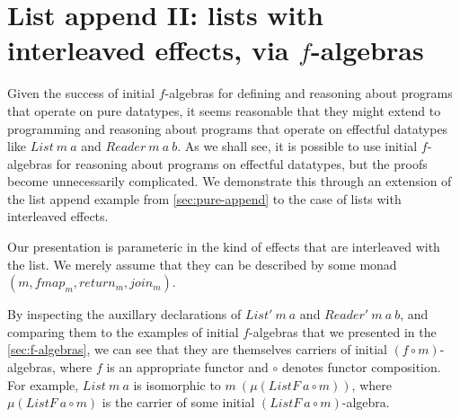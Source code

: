 \documentclass{jfp1}
\begin{document}
\section{List append II: lists with interleaved effects, via \texorpdfstring{$f$}{f}-algebras}
\label{sec:direct-eappend}

Given the success of initial $f$-algebras for defining and reasoning
about programs that operate on pure datatypes, it seems reasonable
that they might extend to programming and reasoning about programs
that operate on effectful datatypes like $\mathit{List}~m~a$ and
$\mathit{Reader}~m~a~b$. As we shall see, it is possible to use
initial $f$-algebras for reasoning about programs on effectful
datatypes, but the proofs become unnecessarily complicated. We
demonstrate this through an extension of the list append example from
\autoref{sec:pure-append} to the case of lists with interleaved
effects.

Our presentation is parameteric in the kind of effects that
are interleaved with the list. We merely assume that they can be
described by some monad $(m, \mathit{fmap_m}, \mathit{return_m},
\mathit{join_m})$.

By inspecting the auxillary declarations of $\mathit{List'}~m~a$ and
$\mathit{Reader'}~m~a~b$, and comparing them to the examples of
initial $f$-algebras that we presented in the
\autoref{sec:f-algebras}, we can see that they are themselves carriers
of initial $(f \circ m)$-algebras, where $f$ is an appropriate functor
and $\circ$ denotes functor composition. For example,
$\mathit{List}~m~a$ is isomorphic to $m~(\mu (\mathit{ListF}~a \circ
m))$, where $\mu (\mathit{ListF}~a \circ m)$ is the carrier of some
initial $(\mathit{ListF}~a \circ m)$-algebra.
\end{document}
